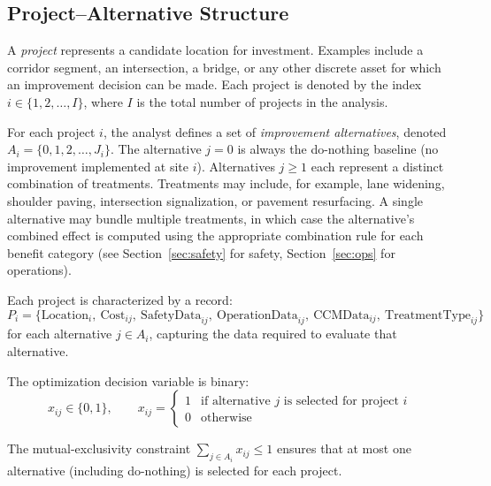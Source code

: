 \subsection{Project--Alternative Structure}

A \emph{project} represents a candidate location for investment. Examples
include a corridor segment, an intersection, a bridge, or any other discrete
asset for which an improvement decision can be made. Each project is denoted by
the index $i \in \{1, 2, \ldots, I\}$, where $I$ is the total number of
projects in the analysis.

For each project $i$, the analyst defines a set of \emph{improvement
alternatives}, denoted $A_i = \{0, 1, 2, \ldots, J_i\}$. The alternative
$j = 0$ is always the do-nothing baseline (no improvement implemented at site
$i$). Alternatives $j \geq 1$ each represent a distinct combination of
treatments. Treatments may include, for example, lane widening, shoulder paving,
intersection signalization, or pavement resurfacing. A single alternative may
bundle multiple treatments, in which case the alternative's combined effect is
computed using the appropriate combination rule for each benefit category (see
Section~\ref{sec:safety} for safety, Section~\ref{sec:ops} for operations).

Each project is characterized by a record:
\begin{equation}
P_i = \{ \mathrm{Location}_i,\ \mathrm{Cost}_{ij},\ \mathrm{SafetyData}_{ij},\
         \mathrm{OperationData}_{ij},\ \mathrm{CCMData}_{ij},\
         \mathrm{TreatmentType}_{ij} \}
\end{equation}
\noindent for each alternative $j \in A_i$, capturing the data required to
evaluate that alternative.

The optimization decision variable is binary:
\begin{equation}
x_{ij} \in \{0, 1\}, \qquad
x_{ij} = \begin{cases}
1 & \text{if alternative } j \text{ is selected for project } i \\
0 & \text{otherwise}
\end{cases}
\end{equation}

The mutual-exclusivity constraint
$\sum_{j \in A_i} x_{ij} \leq 1$ ensures that at most one alternative (including
do-nothing) is selected for each project.

